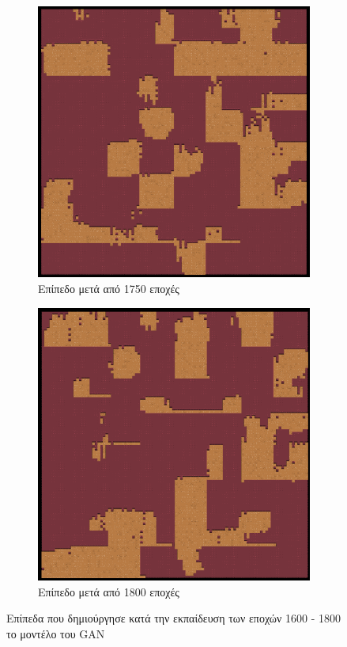 \begin{figure}[H]
\begin{subfigure}{.5\textwidth}
  \centering
  \includegraphics[width=.8\linewidth]{../images/generated/1750.png}
  \caption{Επίπεδο μετά από 1750 εποχές}
  \label{fig:sfig2}
\end{subfigure}
\begin{subfigure}{.5\textwidth}
  \centering
  \includegraphics[width=.8\linewidth]{../images/generated/1800.png}
  \caption{Επίπεδο μετά από 1800 εποχές}
  \label{fig:sfig2}
\end{subfigure}
\caption{Επίπεδα που δημιούργησε κατά την εκπαίδευση των εποχών 1600 - 1800 το μοντέλο του GAN}
\label{fig:fig}
\end{figure}

